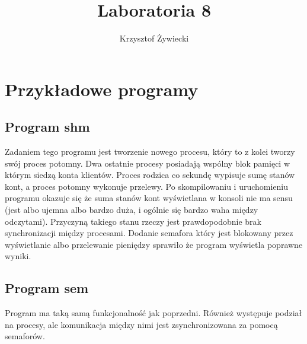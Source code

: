 \documentclass[a4paper, 11pt]{article}
\author{Krzysztof Żywiecki}
\title{Laboratoria 8}
\begin{document}
	
\maketitle

\section*{Przykładowe programy}

\subsection*{Program shm}

Zadaniem tego programu jest tworzenie nowego procesu, który to z kolei tworzy swój proces potomny. Dwa ostatnie procesy posiadają wspólny blok pamięci w którym siedzą konta klientów. Proces rodzica co sekundę wypisuje sumę stanów kont, a proces potomny wykonuje przelewy. Po skompilowaniu i uruchomieniu programu okazuje się że suma stanów kont wyświetlana w konsoli nie ma sensu (jest albo ujemna albo bardzo duża, i ogólnie się bardzo waha między odczytami). Przyczyną takiego stanu rzeczy jest prawdopodobnie brak synchronizacji między procesami. Dodanie semafora który jest blokowany przez wyświetlanie albo przelewanie pieniędzy sprawiło że program wyświetla poprawne wyniki.

\subsection*{Program sem}
	
Program ma taką samą funkcjonalność jak poprzedni. Również występuje podział na procesy, ale komunikacja między nimi jest zsynchronizowana za pomocą semaforów. 

	
	
\end{document}
